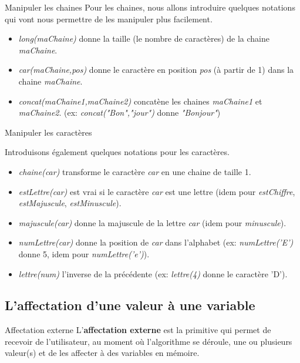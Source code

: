 \begin{frame}{Manipuler les chaines}
	Pour les chaines, nous allons introduire quelques notations
	qui vont nous permettre de les manipuler plus facilement.

	\begin{itemize}
	\item \textit{long(maChaine)}
		donne la taille (le nombre de caractères) de la chaine 
		\textit{maChaine}.
	\item \textit{car(maChaine,pos)}
		donne le caractère en position \textit{pos} 
		(à partir de 1) dans la chaine \textit{maChaine}.
	\item \textit{concat(maChaine1,maChaine2)}
		concatène les chaines \textit{maChaine1} 
		et \textit{maChaine2}.
		(ex: \textit{concat("Bon","jour")} donne \textit{"Bonjour"})
	\end{itemize}
\end{frame}

\begin{frame}{Manipuler les caractères}

		Introduisons également quelques notations pour les caractères.

		\begin{itemize}
		\item \textit{chaine(car)} transforme le caractère \textit{car} en une chaine de taille 1.
		\item \textit{estLettre(car)} est vrai si le caractère \textit{car} est une lettre
			(idem pour \textit{estChiffre}, 
			\textit{estMajuscule}, 
			\textit{estMinuscule}).
		\item \textit{majuscule(car)} donne la majuscule de la lettre \textit{car}
			(idem pour \textit{minuscule}).
		\item \textit{numLettre(car)} donne la position de \textit{car} dans l'alphabet (ex: \textit{numLettre('E')} donne 5, 
		idem pour \textit{numLettre('e')}).
		\item \textit{lettre(num)} l'inverse de la précédente (ex: \textit{lettre(4)} donne le caractère 'D').
	\end{itemize}
\end{frame}

\subsection{L’affectation d’une valeur à une variable}
\begin{frame}{Affectation externe}
	L’\textbf{affectation externe} est la primitive qui permet de recevoir de
	l’utilisateur, au moment où l'algorithme se déroule,
	une ou plusieurs valeur(s) et de les affecter à des variables en
	mémoire.

	\bigskip
	
\end{frame}

